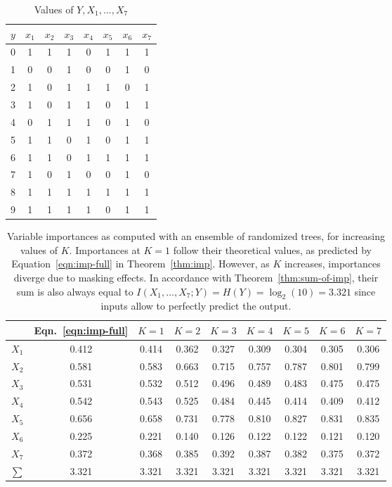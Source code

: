 \begin{table}
    \centering
    \begin{tabular}{| c | c c c c c c c |}
    \hline
    $y$ & $x_1$ & $x_2$ & $x_3$ & $x_4$ & $x_5$ & $x_6$ & $x_7$ \\
    \hline
    \hline
    0 & 1 & 1 & 1 & 0 & 1 & 1 & 1 \\
    1 & 0 & 0 & 1 & 0 & 0 & 1 & 0 \\
    2 & 1 & 0 & 1 & 1 & 1 & 0 & 1 \\
    3 & 1 & 0 & 1 & 1 & 0 & 1 & 1 \\
    4 & 0 & 1 & 1 & 1 & 0 & 1 & 0 \\
    5 & 1 & 1 & 0 & 1 & 0 & 1 & 1 \\
    6 & 1 & 1 & 0 & 1 & 1 & 1 & 1 \\
    7 & 1 & 0 & 1 & 0 & 0 & 1 & 0 \\
    8 & 1 & 1 & 1 & 1 & 1 & 1 & 1 \\
    9 & 1 & 1 & 1 & 1 & 0 & 1 & 1 \\
    \hline
    \end{tabular}
    \caption{Values of $Y, X_1, ..., X_7$}
    \label{table:digits}
\end{table}

\begin{table}
    \begin{tabular}{| c | c c c c c c c c |}
    \hline
        & Eqn.~\ref{eqn:imp-full} & $K=1$ & $K=2$ & $K=3$ & $K=4$ & $K=5$ & $K=6$ & $K=7$ \\
    \hline
    \hline
    $X_1$ & 0.412 & 0.414 & 0.362 & 0.327 & 0.309 & 0.304 & 0.305 & 0.306\\
    $X_2$ & 0.581 & 0.583 & 0.663 & 0.715 & 0.757 & 0.787 & 0.801 & 0.799\\
    $X_3$ & 0.531 & 0.532 & 0.512 & 0.496 & 0.489 & 0.483 & 0.475 & 0.475\\
    $X_4$ & 0.542 & 0.543 & 0.525 & 0.484 & 0.445 & 0.414 & 0.409 & 0.412\\
    $X_5$ & 0.656 & 0.658 & 0.731 & 0.778 & 0.810 & 0.827 & 0.831 & 0.835\\
    $X_6$ & 0.225 & 0.221 & 0.140 & 0.126 & 0.122 & 0.122 & 0.121 & 0.120\\
    $X_7$ & 0.372 & 0.368 & 0.385 & 0.392 & 0.387 & 0.382 & 0.375 & 0.372\\
    \hline
    \hline
    $\sum$& 3.321 & 3.321 & 3.321 & 3.321 & 3.321 & 3.321 & 3.321 & 3.321\\
    \hline
    \end{tabular}
    \caption{Variable importances as computed with an ensemble of randomized trees, for increasing values of $K$. Importances at $K=1$ follow their theoretical values, as predicted by Equation~\ref{eqn:imp-full} in Theorem~\ref{thm:imp}. However, as $K$ increases,  importances diverge due to masking effects. In accordance with Theorem~\ref{thm:sum-of-imp}, their sum is also always equal to $I(X_{1}, \ldots, X_{7}; Y) = H(Y) = \log_{2}(10)= 3.321$ since inputs allow to perfectly predict the output.}
    \label{table:imp}
\end{table}

